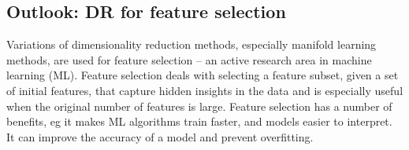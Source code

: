 \documentclass[journal, a4paper]{IEEEtran}
\begin{document}







\subsection{Outlook: DR for feature selection}

Variations of dimensionality reduction methods, especially manifold learning methods, are used for feature selection -- an active research area in machine learning (ML). %
Feature selection deals with selecting a feature subset, given a set of initial features, that capture hidden insights in the data and is especially useful when the original number of features is large.
Feature selection has a number of benefits, eg it makes ML algorithms train faster, and models easier to interpret. 
%
%
It can improve the accuracy of a model and prevent overfitting. 


%
\end{document}
